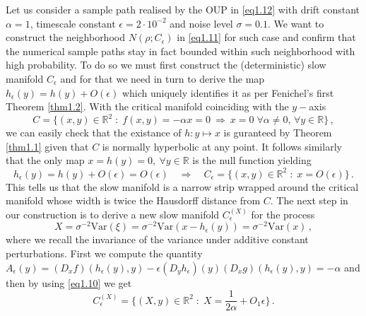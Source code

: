 \documentclass[../main.tex]{subfiles}
\begin{document}
\begin{example}[label=ex1.2]{}{}
        Let us consider a sample path realised by the OUP in \eqref{eq1.12} with drift constant $\alpha=1$, timescale constant $\epsilon=2\cdot10^{-2}$ and noise level $\sigma=0.1$. 
        We want to construct the neighborhood $N(\rho;C_{\epsilon})$ in \eqref{eq1.11} for such case and confirm that the numerical sample paths stay in fact bounded within such neighborhood with high probability. 
        To do so we must first construct the (deterministic) slow manifold $C_{\epsilon}$ and for that we need in turn to derive the map $h_{\epsilon}(y)=h(y)+O(\epsilon)$ which uniquely identifies it as per Fenichel's first Theorem \ref{thm1.2}. 
        With the critical manifold coinciding with the $y-$axis
        \begin{equation*}
            C=\{(x,y)\in \mathbb{R}^{2}\;:\;f(x,y)=-\alpha x = 0\:\Rightarrow\: x=0\;\forall \alpha\neq0,\,\forall y\in \mathbb{R}\}\,,
        \end{equation*}
        we can easily check that the existance of $h:y\mapsto x$ is guranteed by Theorem \ref{thm1.1} given that $C$ is normally hyperbolic at any point.
        It follows similarly that the only map $x=h(y)=0,\:\forall y\in \mathbb{R}$ is the null function yielding 
        \begin{equation*}
                h_{\epsilon}(y) = h(y) + O(\epsilon) = O(\epsilon)\quad\Longrightarrow\quad C_{\epsilon}=\{(x,y)\in \mathbb{R}^{2}\;:\;x=O(\epsilon)\}\,.
        \end{equation*}
        This tells us that the slow manifold is a narrow strip wrapped around the critical manifold whose width is twice the Hausdorff distance from $C$.
        The next step in our construction is to derive a new slow manifold $C_{\epsilon}^{(X)}$ for the process 
        \begin{equation*}
             X=\sigma^{-2}\text{Var}(\xi)=\sigma^{-2}\text{Var}(x - h_{\epsilon}(y))=\sigma^{-2}\text{Var}(x)\,,
        \end{equation*}
        where we recall the invariance of the variance under additive constant perturbations.
        First we compute the quantity $A_{\epsilon}(y)=(D_x f)(h_{\epsilon}(y),y) - \epsilon (D_y h_{\epsilon})(y) (D_x g)(h_{\epsilon}(y),y)=-\alpha$ and then by using \eqref{eq1.10} we get
        \begin{equation*}
                C_{\epsilon}^{(X)}=\{(X,y)\in \mathbb{R}^{2}\;:\;X=\frac{1}{2 \alpha}+O_{1}\epsilon\}\,.
        \end{equation*}

\end{example}
\end{document}
